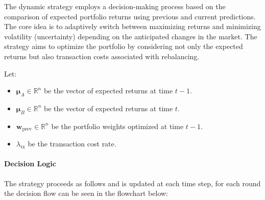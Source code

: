 The dynamic strategy employs a decision-making process based on the comparison of expected portfolio returns using previous and current predictions. The core idea is to adaptively switch between maximizing returns and minimizing volatility (uncertainty) depending on the anticipated changes in the market. The strategy aims to optimize the portfolio by considering not only the expected returns but also transaction costs associated with rebalancing.

Let:

\begin{itemize}
    \item \( \boldsymbol{\mu}_A \in \mathbb{R}^n \) be the vector of expected returns at time \( t-1 \).
    \item \( \boldsymbol{\mu}_B \in \mathbb{R}^n \) be the vector of expected returns at time \( t \).
    \item \( \mathbf{w}_{\text{prev}} \in \mathbb{R}^n \) be the portfolio weights optimized at time \( t-1 \).
    \item \( \lambda_{\text{tx}} \) be the transaction cost rate.
\end{itemize}

\paragraph{Decision Logic}

The strategy proceeds as follows and is updated at each time step, for each round the decision flow can be seen in the flowchart below:

